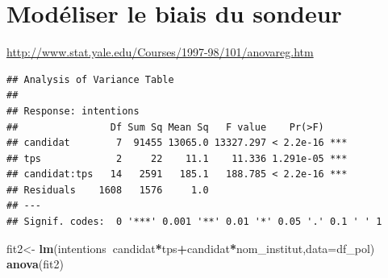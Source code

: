 \documentclass[
]{book}
\newenvironment{Shaded}{\begin{snugshade}}{\end{snugshade}}
\newcommand{\DataTypeTok}[1]{\textcolor[rgb]{0.13,0.29,0.53}{#1}}
\newcommand{\DecValTok}[1]{\textcolor[rgb]{0.00,0.00,0.81}{#1}}
\newcommand{\KeywordTok}[1]{\textcolor[rgb]{0.13,0.29,0.53}{\textbf{#1}}}
\newcommand{\NormalTok}[1]{#1}
\newcommand{\OperatorTok}[1]{\textcolor[rgb]{0.81,0.36,0.00}{\textbf{#1}}}
\newcommand{\StringTok}[1]{\textcolor[rgb]{0.31,0.60,0.02}{#1}}
\begin{document}
\hypertarget{moduxe9liser-le-biais-du-sondeur}{%
\section{Modéliser le biais du sondeur}\label{moduxe9liser-le-biais-du-sondeur}}

\url{http://www.stat.yale.edu/Courses/1997-98/101/anovareg.htm}

\begin{Shaded}
\end{Shaded}

\begin{verbatim}
## Analysis of Variance Table
## 
## Response: intentions
##                Df Sum Sq Mean Sq   F value    Pr(>F)    
## candidat        7  91455 13065.0 13327.297 < 2.2e-16 ***
## tps             2     22    11.1    11.336 1.291e-05 ***
## candidat:tps   14   2591   185.1   188.785 < 2.2e-16 ***
## Residuals    1608   1576     1.0                        
## ---
## Signif. codes:  0 '***' 0.001 '**' 0.01 '*' 0.05 '.' 0.1 ' ' 1
\end{verbatim}

\begin{Shaded}
\begin{Highlighting}[]
\NormalTok{fit2<-}\StringTok{ }\KeywordTok{lm}\NormalTok{(intentions}\OperatorTok{~}\NormalTok{candidat}\OperatorTok{*}\NormalTok{tps}\OperatorTok{+}\NormalTok{candidat}\OperatorTok{*}\NormalTok{nom_institut,}\DataTypeTok{data=}\NormalTok{df_pol)}
\KeywordTok{anova}\NormalTok{(fit2)}
\end{Highlighting}
\end{Shaded}
\end{document}
